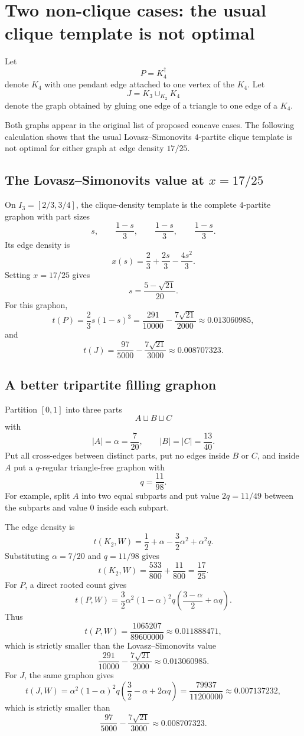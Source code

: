 \documentclass[11pt]{amsart}
\theoremstyle{definition}
\newcommand{\1}{\mathbf 1}
\begin{document}
\section{Two non-clique cases: the usual clique template is not optimal}

Let
\[
   P=K_4^\dagger
\]
denote $K_4$ with one pendant edge attached to one vertex of the $K_4$.  Let
\[
   J=K_3\cup_{K_2}K_4
\]
denote the graph obtained by gluing one edge of a triangle to one edge of a $K_4$.

Both graphs appear in the original list of proposed concave cases.  The following calculation shows that the usual Lovasz--Simonovits $4$-partite clique template is not optimal for either graph at edge density $17/25$.

\subsection{The Lovasz--Simonovits value at $x=17/25$}

On $I_3=[2/3,3/4]$, the clique-density template is the complete $4$-partite graphon with part sizes
\[
   s,\qquad \frac{1-s}{3},\qquad \frac{1-s}{3},\qquad \frac{1-s}{3}.
\]
Its edge density is
\[
   x(s)=\frac23+\frac{2s}{3}-\frac{4s^2}{3}.
\]
Setting $x=17/25$ gives
\[
   s=\frac{5-\sqrt{21}}{20}.
\]
For this graphon,
\[
   t(P)=\frac23s(1-s)^3
   =\frac{291}{10000}-\frac{7\sqrt{21}}{2000}
   \approx 0.013060985,
\]
and
\[
   t(J)=\frac{97}{5000}-\frac{7\sqrt{21}}{3000}
   \approx 0.008707323.
\]

\subsection{A better tripartite filling graphon}

Partition $[0,1]$ into three parts
\[
   A\sqcup B\sqcup C
\]
with
\[
   |A|=\alpha=\frac7{20},
   \qquad |B|=|C|=\frac{13}{40}.
\]
Put all cross-edges between distinct parts, put no edges inside $B$ or $C$, and inside $A$ put a $q$-regular triangle-free graphon with
\[
   q=\frac{11}{98}.
\]
For example, split $A$ into two equal subparts and put value $2q=11/49$ between the subparts and value $0$ inside each subpart.

The edge density is
\[
   t(K_2,W)=\frac12+\alpha-\frac32\alpha^2+\alpha^2q.
\]
Substituting $\alpha=7/20$ and $q=11/98$ gives
\[
   t(K_2,W)=\frac{533}{800}+\frac{11}{800}=\frac{17}{25}.
\]
For $P$, a direct rooted count gives
\[
   t(P,W)=\frac32\alpha^2(1-\alpha)^2q
          \left(\frac{3-\alpha}{2}+\alpha q\right).
\]
Thus
\[
   t(P,W)=\frac{1065207}{89600000}\approx 0.011888471,
\]
which is strictly smaller than the Lovasz--Simonovits value
\[
   \frac{291}{10000}-\frac{7\sqrt{21}}{2000}\approx 0.013060985.
\]
For $J$, the same graphon gives
\[
   t(J,W)=\alpha^2(1-\alpha)^2q
          \left(\frac32-\alpha+2\alpha q\right)
       =\frac{79937}{11200000}\approx 0.007137232,
\]
which is strictly smaller than
\[
   \frac{97}{5000}-\frac{7\sqrt{21}}{3000}\approx 0.008707323.
\]
\end{document}
